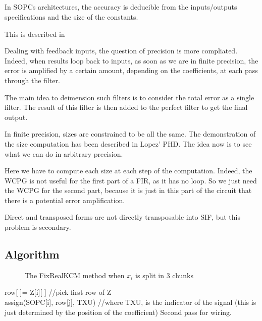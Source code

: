 \subsection{}

In SOPCs architectures, the accuracy is deducible from the inputs/outputs specifications and the size of the constants.

This is described in %

Dealing with feedback inputs, the question of precision is more compliated.
Indeed, when results loop back to inputs, as soon as we are in finite precision, the error is amplified by a certain amount, depending on the coefficients, at each pass through the filter.

The main idea to deimension such filters is to consider the total error as a single filter.
The result of this filter is then added to the perfect filter to get the final output.

In finite precision, sizes are constrained to be all the same. The demonstration of the size computation has been described in Lopez' PHD.
The idea now is to see what we can do in arbitrary precision.

Here we have to compute each size at each step of the computation. Indeed, the WCPG is not useful for the first part of a FIR, as it has no loop.
So we just need the WCPG for the second part, because it is just in this part of the circuit that there is a potential error amplification.

Direct and transposed forms are not directly transposable into SIF, but this problem is secondary.

\subsection{Algorithm}
\begin{figure}[!h]
\begin{center}
\scalebox{6}{}
\end{center}
\caption{The FixRealKCM method when $x_i$ is split in 3 chunks   \label{fig:FixRealKCM}}
\end{figure}

	\begin{algorithm}[H]
	 {
	 	row[ ]= Z[i][ ] //pick first row of Z \\
	 	 {
	 		assign(SOPC[i], row[j], TXU) //where TXU, is the indicator of the signal (this is just determined by the position of the coefficient)
	 	}
		Second pass for wiring.
	}
	\end{algorithm}
	

